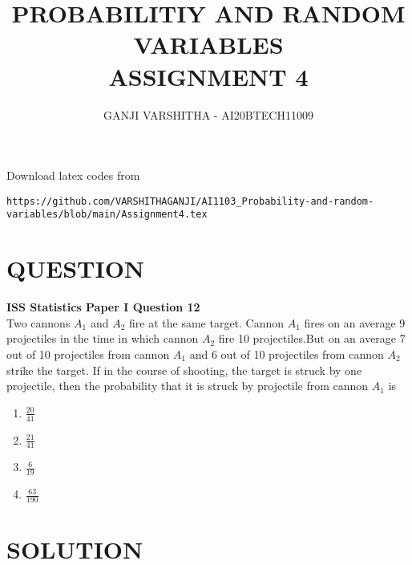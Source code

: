 \documentclass[journal,12pt,twocolumn]{IEEEtran}
\begin{document}
\let\vec\mathbf
\renewcommand{\thefigure}{\theproblem}
\def\putbox#1#2#3{\makebox[0in][l]{\makebox[#1][l]{}\raisebox{\baselineskip}[0in][0in]{\raisebox{#2}[0in][0in]{#3}}}}
     \def\rightbox#1{\makebox[0in][r]{#1}}
     \def\centbox#1{\makebox[0in]{#1}}
     \def\topbox#1{\raisebox{-\baselineskip}[0in][0in]{#1}}
     \def\midbox#1{\raisebox{-0.5\baselineskip}[0in][0in]{#1}}
\vspace{3cm}
\title{\textbf{PROBABILITIY AND RANDOM VARIABLES\\ASSIGNMENT 4}}
\author{GANJI VARSHITHA - AI20BTECH11009}
\maketitle
\newpage
\bigskip
\renewcommand{\thefigure}{\arabic{figure}}
\renewcommand{\thetable}{\arabic{table}}
Download latex codes from 
%
\begin{lstlisting}
https://github.com/VARSHITHAGANJI/AI1103_Probability-and-random-variables/blob/main/Assignment4.tex
\end{lstlisting}
\section*{QUESTION}
\textbf{ISS Statistics Paper I Question 12 }
\\
Two cannons $A_{1}$ and $A_{2}$ fire at the same target. Cannon $A_{1}$ fires on an average 9 projectiles in the time in which cannon $A_{2}$ fire 10 projectiles.But on an average 7 out of 10 projectiles from cannon $A_{1}$ and 6 out of 10 projectiles from cannon $A_{2}$ strike the target. If in the course of shooting, the target is struck by one projectile, then the probability that it is struck by projectile from cannon $A_{1}$ is 

\begin{enumerate}
   \item  $\frac{20}{41}$\\
   \item  $\frac{21}{41}$ \\ 
   \item  $\frac{6}{19}$ \\
   \item  $\frac{63}{190}$ \\ 
\end{enumerate}
\section*{SOLUTION}
\end{document}
